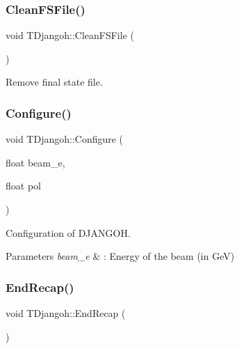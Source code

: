 \mbox{\label{class_t_djangoh_ade1e9ff8b29d2b95d24a22c3474a7ba6}} 
\subsubsection{\texorpdfstring{Clean\+F\+S\+File()}{CleanFSFile()}}
{\footnotesize\ttfamily void T\+Djangoh\+::\+Clean\+F\+S\+File (\begin{DoxyParamCaption}{ }\end{DoxyParamCaption})\hspace{0.3cm}{\ttfamily [inline]}}



Remove final state file. 

\mbox{\label{class_t_djangoh_af58a4c6bb944a4ce79cc538829e490e8}} 
\subsubsection{\texorpdfstring{Configure()}{Configure()}}
{\footnotesize\ttfamily void T\+Djangoh\+::\+Configure (\begin{DoxyParamCaption}\item[{float}]{beam\+\_\+e,  }\item[{float}]{pol }\end{DoxyParamCaption})}



Configuration of D\+J\+A\+N\+G\+OH. 


\begin{DoxyParams}{Parameters}
{\em beam\+\_\+e} & \+: Energy of the beam (in GeV) \\
\hline
\end{DoxyParams}
\mbox{\label{class_t_djangoh_a076cac82063ed8740ac0a32e77c02c94}} 
\subsubsection{\texorpdfstring{End\+Recap()}{EndRecap()}}
{\footnotesize\ttfamily void T\+Djangoh\+::\+End\+Recap (\begin{DoxyParamCaption}{ }\end{DoxyParamCaption})}



